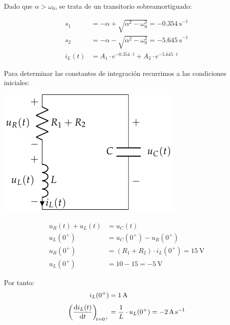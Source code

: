 \vspace{3mm}
Dado que $\alpha > \omega_0$, se trata de un transitorio
sobreamortiguado:

\begin{align*}
  s_1 &= -\alpha + \sqrt{\alpha^2 - \omega_0^2} = \SI{-0.354}{\second}^{-1}\\
  s_2 &= -\alpha - \sqrt{\alpha^2 - \omega_0^2} = \SI{-5.645}{\second}^{-1}\\
  i_L(t) &= A_1 \cdot e^{-0.354 \cdot t} + A_2 \cdot e^{-5.645 \cdot t}
\end{align*}

\vspace{3mm}
Para determinar las constantes de integración recurrimos a las
condiciones iniciales:

\vspace{3mm}
\begin{minipage}{0.3\textwidth}
  \includegraphics[scale=1]{figuras/FM_4_8_natural}
\end{minipage}
\begin{minipage}{0.7\textwidth}
  \begin{align*}
    u_R(t) + u_L(t) &= u_C(t)\\
    u_L(0^+) &= u_C(0^+) - u_R(0^+)\\
    u_R(0^+) &= (R_1 + R_2) \cdot i_L(0^+) = \SI{15}{\volt}\\
    u_L(0^+) &= 10 - 15 = \SI{-5}{\volt}
  \end{align*}
\end{minipage}

\vspace{5mm}
Por tanto:
\begin{align*}
  i_L(0^+) &= \SI{1}{\ampere}\\[3pt]
  \diff{i_L(t)}{t}[t = 0^+] &= \frac{1}{L} \cdot u_L(0^+) = \SI{-2}{\ampere\per\second}
\end{align*}

